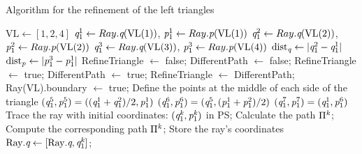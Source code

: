 \begin{algorithm}[h]
\caption{Algorithm for the refinement of the left triangles}\label{alg:left_triangle}
\begin{algorithmic}[1]
\State $\textrm{VL}\gets [1,2,4]$
\State $\textit{q}_1^1\gets Ray.\textit{q}(\textrm{VL}(1))$, $\textit{p}_1^1\gets Ray.\textit{p}(\textrm{VL}(1))$
\State $\textit{q}_1^2\gets Ray.\textit{q}(\textrm{VL}(2))$, $\textit{p}_1^2\gets Ray.\textit{p}(\textrm{VL}(2))$
\State $\textit{q}_1^3\gets Ray.\textit{q}(\textrm{VL}(3))$, $\textit{p}_1^3\gets Ray.\textit{p}(\textrm{VL}(4))$
\State $\textrm{dist}_{\textit{q}}\gets \mbox{$|\textit{q}_1^2-\textit{q}_1^1|$}$
\State $\textrm{dist}_{\textit{p}}\gets \mbox{$|\textit{p}_1^{3}-\textit{p}_1^1|$}$
\State RefineTriangle $\gets$  false;
\State DifferentPath $\gets$  false;
\State RefineTriangle $\gets$  true;
\EndIf
{}
\State DifferentPath $\gets$  true;
\EndIf
\EndFor
{}
\State RefineTriangle $\gets$  DifferentPath;
\Else
{}
\State Ray(\textrm{VL}).boundary $\gets$ true; 
\EndIf
\EndIf
{}
\State Define the points at the middle of each side of the triangle
\State $(\textit{q}_1^5, \textit{p}_1^5) = ((\textit{q}_1^1+\textit{q}_1^2)/2, \textit{p}_1^1)$
\State $(\textit{q}_1^6, \textit{p}_1^6) = (\textit{q}_1^5, (\textit{p}_1^1+\textit{p}_1^2)/2)$
\State $(\textit{q}_1^7, \textit{p}_1^7) = (\textit{q}_1^1, \textit{p}_1^6)$
\State Trace the ray with initial coordinates: $(\textit{q}_1^{\textit{k}}, \textit{p}_1^{\textit{k}})$ in PS;
\State Calculate the path $\Pi^{\textit{k}}$;
\State Compute the corresponding path $\Pi^{\textit{k}}$;
\State Store the ray's coordinates $\mbox{Ray}.\textit{q}\gets [\mbox{Ray}.\textit{q}, \textit{q}_1^{\textit{k}}]$;

\end{algorithmic}
\end{algorithm}
